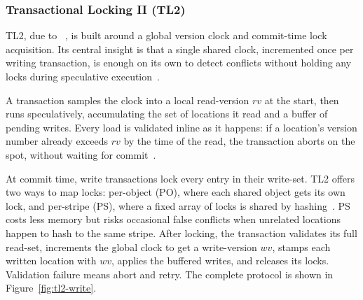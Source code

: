 \subsubsection{Transactional Locking II (TL2)}

TL2, due to \citeauthor{dice2006transactional}~\cite{dice2006transactional},
is built around a global version clock and commit-time lock acquisition. Its
central insight is that a single shared clock, incremented once per writing
transaction, is enough on its own to detect conflicts without holding any
locks during speculative execution~\cite{dice2006transactional}.

A transaction samples the clock into a local read-version $rv$ at the start,
then runs speculatively, accumulating the set of locations it read and a
buffer of pending writes. Every load is validated inline as it happens:
if a location's version number already exceeds $rv$ by the time of the read,
the transaction aborts on the spot, without waiting for
commit~\cite{dice2006transactional}.

At commit time, write transactions lock every entry in their write-set. TL2
offers two ways to map locks: per-object (PO), where each shared object gets
its own lock, and per-stripe (PS), where a fixed array of locks is shared by
hashing~\cite{dice2006transactional}. PS costs less memory but risks
occasional false conflicts when unrelated locations happen to hash to the
same stripe. After locking, the transaction validates its full read-set,
increments the global clock to get a write-version $wv$, stamps each written
location with $wv$, applies the buffered writes, and releases its locks.
Validation failure means abort and retry. The complete protocol is shown in
Figure~\ref{fig:tl2-write}.

